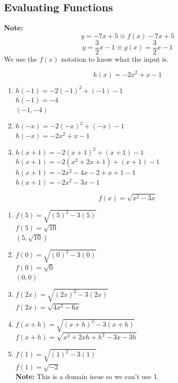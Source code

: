 \subsection{Evaluating Functions}
\textbf{Note: }
$$y = -7x + 5 \equiv f(x) -7x + 5$$
$$y = \frac{3}{2} x - 1 \equiv g(x) = \frac{3}{2} x - 1$$
We use the $f(x)$ notation to know what the input is.

\begin{example}[Exponents]
  $$h(x) = -2x^2 + x - 1$$
  \begin{enumerate}
  \item $h(-1) = -2(-1)^2 + (-1) - 1$ \\
    $h(-1) = -4$ \\
    \textbf{$(-1, -4)$}
  \item $h(-x) = -2(-x)^2 + (-x) - 1$ \\
    $h(-x) = -2x^2 + x - 1$
  \item $h(x + 1) = -2(x + 1)^2 + (x + 1) - 1$ \\
    $h(x + 1) = -2(x^2 + 2x + 1) + (x + 1) - 1$ \\
    $h(x + 1) = -2x^2 - 4x - 2 + x + 1 - 1$ \\
    $h(x + 1) = -2x^2 - 3x - 1$
  \end{enumerate}
\end{example}

\begin{example}
  $$f(x) = \sqrt{x^2 - 3x}$$
  \begin{enumerate}
  \item $f(5) = \sqrt{(5)^2 - 3(5)}$ \\
    $f(5) = \sqrt{10}$ \\
    $(5, \sqrt{10})$
  \item $f(0) = \sqrt{(0)^2 - 3(0)}$ \\
    $f(0) = \sqrt{0}$ \\
    $(0, 0)$
  \item $f(2x) = \sqrt{(2x)^2 - 3(2x)}$ \\
    $f(2x) = \sqrt{4x^2 - 6x}$
  \item $f(x + h) = \sqrt{(x + h)^2 - 3(x + h)}$ \\
    $f(x + h) = \sqrt{x^2 + 2xh + h^2 - 3x - 3h}$
  \item $f(1) = \sqrt{(1)^2 - 3(1)}$ \\
    $f(1) = \sqrt{-2}$ \\
    \textbf{Note: } This is a domain issue so we can't use 1.
  \end{enumerate}
\end{example}

